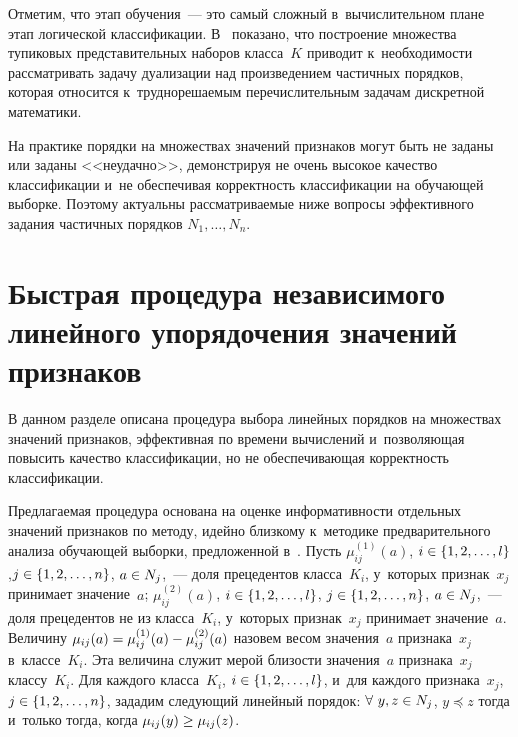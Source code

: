 \begin{multicols}{2}
  Отметим, что этап обучения~--- это самый слож\-ный в~вы\-чис\-ли\-тель\-ном плане 
этап логической классификации. В~\cite{2-duk} показано, что по\-стро\-ение 
множества тупиковых пред\-ста\-ви\-тель\-ных наборов класса~$K$ приводит 
к~не\-об\-хо\-ди\-мости рас\-смат\-ри\-вать задачу дуализации над произведением 
час\-тич\-ных порядков, которая относится к~труд\-но\-ре\-ша\-емым пе\-ре\-чис\-ли\-тель\-ным 
задачам дискретной ма\-те\-ма\-тики.
{

} 
  
  На практике порядки на множествах значений признаков могут быть не 
заданы или заданы <<неудачно>>, демонстрируя не очень высокое качество 
классификации и~не обеспечивая корректность классификации на обучающей 
выборке. Поэтому актуальны рассматриваемые ниже вопросы эффективного 
задания частичных порядков $N_1,\ldots , N_n$.

\section{Быстрая процедура независимого линейного упорядочения 
значений признаков}

  В данном разделе описана процедура выбора линейных порядков на 
множествах значений признаков, эффективная по времени вычислений 
и~поз\-во\-ля\-ющая повысить качество классификации, но не обеспечивающая 
корректность классификации.
  
  Предлагаемая процедура основана на оценке информативности отдельных 
значений признаков по методу, идейно близкому к~методике предварительного 
анализа обучающей выборки, предложенной в~\cite{3-duk}. Пусть 
$\mu^{(1)}_{ij}(a)$, $i\hm\in \{1,2,\ldots , l\}$,\linebreak $j\hm\in \{1,2,\ldots , n\}$, $a\hm\in 
N_j$,~--- доля прецедентов класса~$K_i$, у~которых признак~$x_j$ принимает 
значение~$a$; $\mu^{(2)}_{ij}(a)$, $i\hm\in \{1,2,\ldots , l\}$, $j\hm\in \{1,2,\ldots 
, n\}$, $a\hm\in N_j$,~--- доля прецедентов не из класса~$K_i$, у~которых 
признак~$x_j$ принимает значение~$a$. Величину $\mu_{ij}(a)\hm= 
\mu^{(1)}_{ij}(a) \hm- \mu^{(2)}_{ij}(a)$ назовем весом значения~$a$ 
\mbox{признака}~$x_j$ в~классе~$K_i$. Эта величина служит мерой близости 
значения~$a$ признака~$x_j$ классу~$K_i$. Для каждого класса~$K_i$, 
$i\hm\in \{1,2,\ldots , l\}$, и~для каждого признака~$x_j$, $j\hm\in \{1,2,\ldots , 
n\}$, зададим сле\-ду\-ющий линейный порядок: $\forall\ y,z\hm\in N_j$, 
$y\preceq z$ тогда и~только тогда, когда $\mu_{ij}(y)\hm \geq \mu_{ij}(z)$. 
  

\end{multicols}
